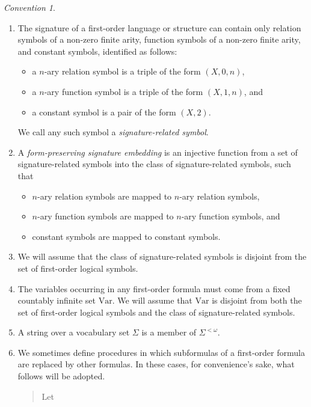 \documentclass[12pt, twoside]{memoir}
\numberwithin{equation}{section}
\theoremstyle{definition}
\theoremstyle{remark}
\newtheorem{con}[thm]{Convention}
\theoremstyle{definition}
\theoremstyle{definition}
\theoremstyle{definition}
\theoremstyle{remark}
\begin{document}
\begin{con}
\begin{enumerate}[label=(\arabic*)]
    Sometimes, when the correspondence between a signature and its interpretation is clear, we might write $(A; \mathcal{I})$ as $(A; \Vec{S})$, where $\Vec{S}$ is some ordering of $ran(\mathcal{I})$.
    \item The signature of a first-order language or structure can contain only relation symbols of a non-zero finite arity, function symbols of a non-zero finite arity, and constant symbols, identified as follows:
    \begin{itemize}
        \item a $n$-ary relation symbol is a triple of the form $(X, 0, n)$,
        \item a $n$-ary function symbol is a triple of the form $(X, 1, n)$, and
        \item a constant symbol is a pair of the form $(X, 2)$.
    \end{itemize}
    We call any such symbol a \emph{signature-related symbol}.
    \item A \emph{form-preserving signature embedding} is an injective function from a set of signature-related symbols into the class of signature-related symbols, such that
    \begin{itemize}
        \item $n$-ary relation symbols are mapped to $n$-ary relation symbols,
        \item $n$-ary function symbols are mapped to $n$-ary function symbols, and
        \item constant symbols are mapped to constant symbols.
    \end{itemize}
    \item\label{227} We will assume that the class of signature-related symbols is disjoint from the set of first-order logical symbols.
    \item\label{224} The variables occurring in any first-order formula must come from a fixed countably infinite set $\mathrm{Var}$. We will assume that $\mathrm{Var}$ is disjoint from both the set of first-order logical symbols and the class of signature-related symbols.
    \item A string over a vocabulary set $\Sigma$ is a member of $\Sigma^{< \omega}$.
    \item We sometimes define procedures in which subformulas of a first-order formula are replaced by other formulas. In these cases, for convenience's sake, what follows will be adopted.
    \begin{quote}
        Let 
        \begin{itemize}

\end{itemize}
\end{quote}
\end{enumerate}
\end{con}
\end{document}
